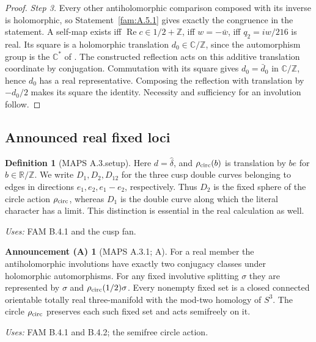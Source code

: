 \documentclass[11pt,a4paper]{article}
\theoremstyle{plain}
\theoremstyle{definition}
\newtheorem{announcement}[theorem]{Announcement (A)}
\newtheorem{definition}[theorem]{Definition}
\begin{document}
\begin{proof}
\par\noindent\textit{Step 3.} Every other antiholomorphic comparison composed with its inverse is
holomorphic, so Statement~\ref{fam:A.5.1} gives exactly the congruence in the statement.
A self-map exists iff $\operatorname{Re}c\in1/2+\mathbb Z$, iff
$w=-\bar w$, iff $q_2=iw/216$ is real. Its square is a holomorphic
translation $d_0\in\mathbb C/\mathbb Z$, since the automorphism group
is the $\mathbb C^*$ of \cite[theorem \texttt{p2:thm:full-automorphisms}]{DGKXv1}. The constructed reflection acts on
this additive translation coordinate by conjugation. Commutation
with its square gives $d_0=\bar d_0$ in $\mathbb C/\mathbb Z$, hence
$d_0$ has a real representative. Composing the reflection with
translation by $-d_0/2$ makes its square the identity. Necessity and
sufficiency for an involution follow.
\end{proof}

\subsection{Announced real fixed loci}
\begin{definition}[MAPS A.3.setup]\label{maps:A.3.setup}
Here $d=\widehat\delta$, and $\rho_{\rm circ}(b)$ is translation by $be$ for $b\in\mathbb R/\mathbb Z$.
We write $D_1,D_2,D_{12}$ for the three cusp double curves belonging to
edges in directions $e_1,e_2,e_1-e_2$, respectively. Thus $D_2$ is the
fixed sphere of the circle action $\rho_{\rm circ}$, whereas $D_1$ is the double
curve along which the literal character has a limit. This distinction
is essential in the real calculation as well.
\end{definition}
\noindent\emph{Uses:} FAM B.4.1 and the cusp fan.\par

\begin{announcement}[MAPS A.3.1; A]\label{maps:A.3.1}
For a real member the antiholomorphic involutions have exactly two
conjugacy classes under holomorphic automorphisms. For any fixed
involutive splitting $\sigma$ they are represented by $\sigma$ and
$\rho_{\rm circ}(1/2)\sigma$. Every nonempty fixed set is a closed connected
orientable totally real three-manifold with the mod-two homology of
$S^3$. The circle $\rho_{\rm circ}$ preserves each such fixed set and acts
semifreely on it.
\end{announcement}
\noindent\emph{Uses:} FAM B.4.1 and B.4.2; the semifree circle action.\par
\end{document}
